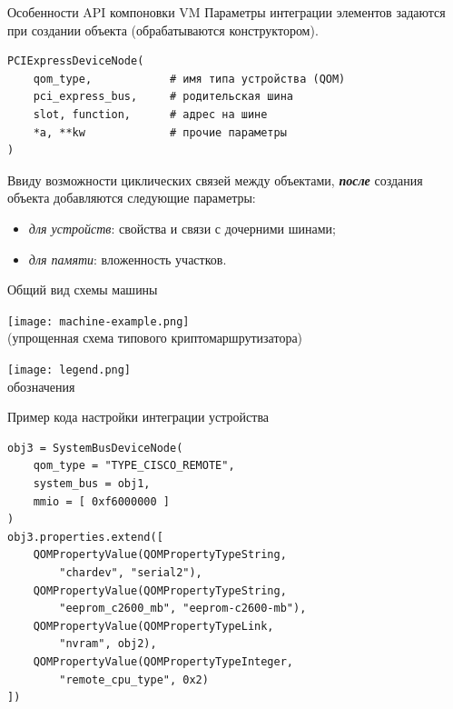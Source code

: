 \documentclass[unicode,hyperref={unicode=true}]{beamer}
\theoremstyle{definition}
\theoremstyle{plain}
\begin{document}
\begin{frame}[fragile]{Особенности API компоновки VM}
Параметры интеграции элементов задаются при создании объекта (обрабатываются
конструктором).\\
\lstset{language=Python}
\begin{lstlisting}
PCIExpressDeviceNode(
    qom_type,            # имя типа устройства (QOM)
    pci_express_bus,     # родительская шина
    slot, function,      # адрес на шине
    *a, **kw             # прочие параметры
)
\end{lstlisting}
\vfill
Ввиду возможности циклических связей между объектами, \textit{\textbf{после}}
создания объекта добавляются следующие параметры:
\begin{itemize}
\item \textit{для устройств}: свойства и связи с дочерними шинами;
\item \textit{для памяти}: вложенность участков.
\end{itemize}
\end{frame}



\begin{frame}{Общий вид схемы машины}
\begin{minipage}[b]{0.71\textwidth}
\texttt{[image: machine-example.png]}\\
(упрощенная схема типового криптомаршрутизатора)
\end{minipage}
\hfill
\begin{minipage}[t]{0.24\textwidth}
\texttt{[image: legend.png]}\\
обозначения
\end{minipage}
\end{frame}



\begin{frame}[fragile]{Пример кода настройки интеграции устройства}
\lstset{language=Python}
\begin{lstlisting}
obj3 = SystemBusDeviceNode(
    qom_type = "TYPE_CISCO_REMOTE",
    system_bus = obj1,
    mmio = [ 0xf6000000 ]
)
obj3.properties.extend([
    QOMPropertyValue(QOMPropertyTypeString,
        "chardev", "serial2"),
    QOMPropertyValue(QOMPropertyTypeString,
        "eeprom_c2600_mb", "eeprom-c2600-mb"),
    QOMPropertyValue(QOMPropertyTypeLink,
        "nvram", obj2),
    QOMPropertyValue(QOMPropertyTypeInteger,
        "remote_cpu_type", 0x2)
])
\end{lstlisting}

\end{frame}
\end{document}

